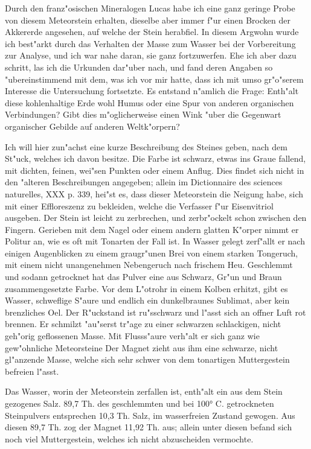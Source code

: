 \documentclass[a4paper, 11pt, oneside]{article}
\begin{document}
Durch den franz"osischen Mineralogen Lucas habe ich eine ganz geringe Probe von diesem Meteorstein erhalten, dieselbe aber immer f"ur einen Brocken der Akkererde angesehen, auf welche der Stein herabfiel. In diesem Argwohn wurde ich best"arkt durch das Verhalten der Masse zum Wasser bei der Vorbereitung zur Analyse, und ich war nahe daran, sie ganz fortzuwerfen. Ehe ich aber dazu schritt, las ich die Urkunden dar"uber nach, und fand deren Angaben so "ubereinstimmend mit dem, was ich vor mir hatte, dass ich mit umso gr"o"serem Interesse die Untersuchung fortsetzte. Es entstand n"amlich die Frage: Enth"alt diese kohlenhaltige Erde wohl Humus oder eine Spur von anderen organischen Verbindungen? Gibt dies m"oglicherweise einen Wink "uber die Gegenwart organischer Gebilde auf anderen Weltk"orpern?

Ich will hier zun"achst eine kurze Beschreibung des Steines geben, nach dem St"uck, welches ich davon besitze. Die Farbe ist schwarz, etwas ins Graue fallend, mit dichten, feinen, wei"sen Punkten oder einem Anflug. Dies findet sich nicht in den "alteren Beschreibungen angegeben; allein im Dictionnaire des sciences naturelles, XXX p. 339, hei"st es, dass dieser Meteorstein die Neigung habe, sich mit einer Effloreszenz zu bekleiden, welche die Verfasser f"ur Eisenvitriol ausgeben. Der Stein ist leicht zu zerbrechen, und zerbr"ockelt schon zwischen den Fingern. Gerieben mit dem Nagel oder einem andern glatten K"orper nimmt er Politur an, wie es oft mit Tonarten der Fall ist. In Wasser gelegt zerf"allt er nach einigen Augenblicken zu einem graugr"unen Brei von einem starken Tongeruch, mit einem nicht unangenehmen Nebengeruch nach frischem Heu. Geschlemmt und sodann getrocknet hat das Pulver eine aus Schwarz, Gr"un und Braun zusammengesetzte Farbe. Vor dem L"otrohr in einem Kolben erhitzt, gibt es Wasser, schweflige S"aure und endlich ein dunkelbraunes Sublimat, aber kein brenzliches Oel. Der R"uckstand ist ru"sschwarz und l"asst sich an offner Luft rot brennen. Er schmilzt "au"serst tr"age zu einer schwarzen schlackigen, nicht geh"orig geflossenen Masse. Mit Flusss"aure verh"alt er sich ganz wie gew"ohnliche Meteorsteine Der Magnet zieht aus ihm eine schwarze, nicht gl"anzende Masse, welche sich sehr schwer von dem tonartigen Muttergestein befreien l"asst.

Das Wasser, worin der Meteorstein zerfallen ist, enth"alt ein aus dem Stein gezogenes Salz. 89,7 Th. des geschlemmten und bei 100° C. getrockneten Steinpulvers entsprechen 10,3 Th. Salz, im wasserfreien Zustand gewogen. Aus diesen 89,7 Th. zog der Magnet 11,92 Th. aus; allein unter diesen befand sich noch viel Muttergestein, welches ich nicht abzuscheiden vermochte.
\end{document}
